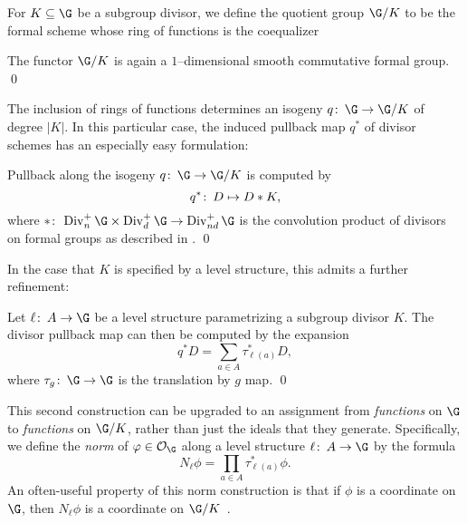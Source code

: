 \begin{definition}
For $K \subseteq \G$ be a subgroup divisor, we define the quotient group $\G/K$ to be the formal scheme whose ring of functions is the coequalizer
\begin{center}
\end{center}
\end{definition}

\begin{lemma}
The functor $\G/K$ is again a $1$--dimensional smooth commutative formal group. \qed
\end{lemma}

The inclusion of rings of functions determines an isogeny $q\co \G \to \G/K$ of degree $|K|$.  In this particular case, the induced pullback map $q^*$ of divisor schemes has an especially easy formulation:
\begin{lemma}
Pullback along the isogeny $q\co \G \to \G/K$ is computed by \[q^* \colon\thinspace D \mapsto D * K,\] where $*\co \Div_n^+ \G \times \Div_d^+ \G \to \Div_{nd}^+ \G$ is the convolution product of divisors on formal groups as described in . \qed
\end{lemma}

In the case that $K$ is specified by a level structure, this admits a further refinement:
\begin{corollary}
Let $\ell\co A \to \G$ be a level structure parametrizing a subgroup divisor $K$.  The divisor pullback map can then be computed by the expansion \[q^* D = \sum_{a \in A} \tau_{\ell(a)}^* D,\] where $\tau_g\co \G \to \G$ is the translation by $g$ map. \qed
\end{corollary}

\begin{definition}
This second construction can be upgraded to an assignment from \emph{functions} on $\G$ to \emph{functions} on $\G/K$, rather than just the ideals that they generate.  Specifically, we define the \textit{norm} of $\phi \in \sheaf O_{\G}$ along a level structure $\ell\co A \to \G$ by the formula \[N_\ell \phi = \prod_{a \in A} \tau_{\ell(a)}^* \phi.\]  An often-useful property of this norm construction is that if $\phi$ is a coordinate on $\G$, then $N_\ell \phi$ is a coordinate on $\G/K$~\cite[Theorem 5.3.1]{StricklandFiniteSubgps}.
\end{definition}


